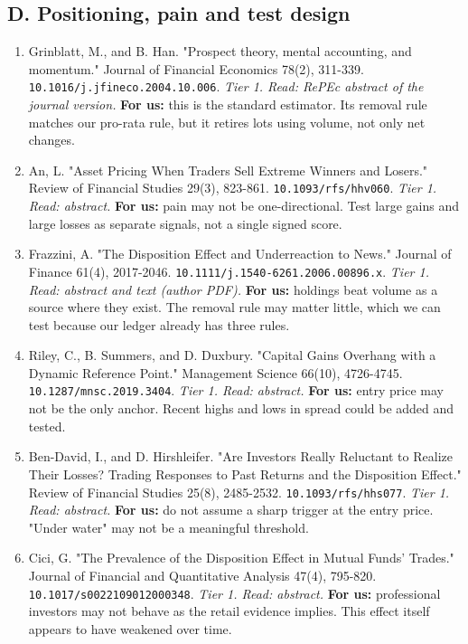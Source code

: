 \subsection*{D. Positioning, pain and test design}
\begin{enumerate}[leftmargin=*,itemsep=3pt]
\item Grinblatt, M., and B. Han. "Prospect theory, mental accounting, and momentum." Journal of Financial Economics 78(2), 311-339. \nolinkurl{10.1016/j.jfineco.2004.10.006}. \emph{Tier 1. Read: RePEc abstract of the journal version.} \textbf{For us:} this is the standard estimator. Its removal rule matches our pro-rata rule, but it retires lots using volume, not only net changes.
\item An, L. "Asset Pricing When Traders Sell Extreme Winners and Losers." Review of Financial Studies 29(3), 823-861. \nolinkurl{10.1093/rfs/hhv060}. \emph{Tier 1. Read: abstract.} \textbf{For us:} pain may not be one-directional. Test large gains and large losses as separate signals, not a single signed score.
\item Frazzini, A. "The Disposition Effect and Underreaction to News." Journal of Finance 61(4), 2017-2046. \nolinkurl{10.1111/j.1540-6261.2006.00896.x}. \emph{Tier 1. Read: abstract and text (author PDF).} \textbf{For us:} holdings beat volume as a source where they exist. The removal rule may matter little, which we can test because our ledger already has three rules.
\item Riley, C., B. Summers, and D. Duxbury. "Capital Gains Overhang with a Dynamic Reference Point." Management Science 66(10), 4726-4745. \nolinkurl{10.1287/mnsc.2019.3404}. \emph{Tier 1. Read: abstract.} \textbf{For us:} entry price may not be the only anchor. Recent highs and lows in spread could be added and tested.
\item Ben-David, I., and D. Hirshleifer. "Are Investors Really Reluctant to Realize Their Losses? Trading Responses to Past Returns and the Disposition Effect." Review of Financial Studies 25(8), 2485-2532. \nolinkurl{10.1093/rfs/hhs077}. \emph{Tier 1. Read: abstract.} \textbf{For us:} do not assume a sharp trigger at the entry price. "Under water" may not be a meaningful threshold.
\item Cici, G. "The Prevalence of the Disposition Effect in Mutual Funds' Trades." Journal of Financial and Quantitative Analysis 47(4), 795-820. \nolinkurl{10.1017/s0022109012000348}. \emph{Tier 1. Read: abstract.} \textbf{For us:} professional investors may not behave as the retail evidence implies. This effect itself appears to have weakened over time.

\end{enumerate}
